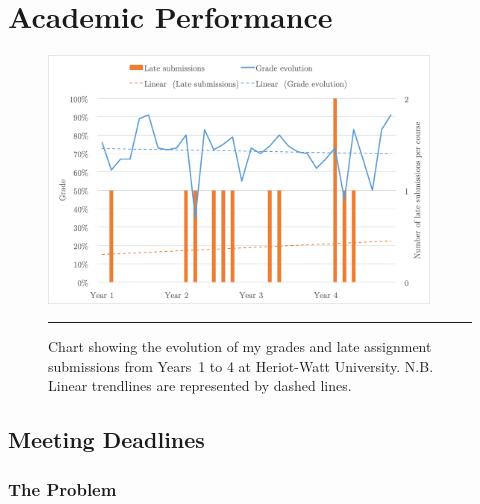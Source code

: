
\section{Academic Performance}


\begin{figure}[htbp]
	\centering
	\includegraphics[width=0.9\textwidth]{figures/GradesVsLateSubs.png}
	\rule{0.9\textwidth}{0.5pt} %
	\caption[Chart showing the evolution of my grades and late assignment submissions.]{Chart showing the evolution of my grades and late assignment submissions from Years~1 to 4 at Heriot-Watt University. N.B. Linear trendlines are represented by dashed lines.}
	\label{fig:gradesVlatesubs}
\end{figure}




\subsection{Meeting Deadlines}




\subsubsection*{The Problem}

